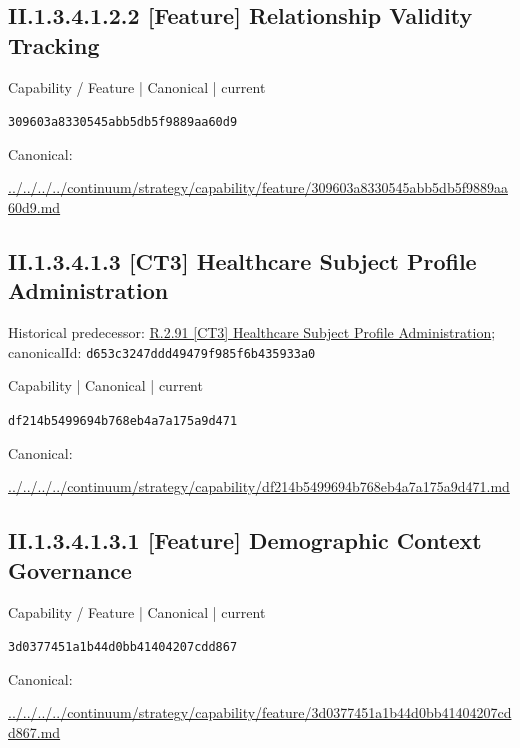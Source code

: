 \documentclass[10pt,a4paper]{article}
\begin{document}
\subsection*{II.1.3.4.1.2.2 [Feature] Relationship Validity Tracking}
\label{element-309603a8330545abb5db5f9889aa60d9}
{\small Capability / Feature | Canonical | current}\par
\texttt{309603a8330545abb5db5f9889aa60d9}\par
Canonical: \par
{\footnotesize\url{../../../../continuum/strategy/capability/feature/309603a8330545abb5db5f9889aa60d9.md}}\par
\subsection*{II.1.3.4.1.3 [CT3] Healthcare Subject Profile Administration}
Historical predecessor: \hyperref[element-d653c3247ddd49479f985f6b435933a0]{R.2.91 [CT3] Healthcare Subject Profile Administration}; canonicalId: \texttt{d653c3247ddd49479f985f6b435933a0}\par
\label{element-df214b5499694b768eb4a7a175a9d471}
{\small Capability | Canonical | current}\par
\texttt{df214b5499694b768eb4a7a175a9d471}\par
Canonical: \par
{\footnotesize\url{../../../../continuum/strategy/capability/df214b5499694b768eb4a7a175a9d471.md}}\par
\subsection*{II.1.3.4.1.3.1 [Feature] Demographic Context Governance}
\label{element-3d0377451a1b44d0bb41404207cdd867}
{\small Capability / Feature | Canonical | current}\par
\texttt{3d0377451a1b44d0bb41404207cdd867}\par
Canonical: \par
{\footnotesize\url{../../../../continuum/strategy/capability/feature/3d0377451a1b44d0bb41404207cdd867.md}}\par
\end{document}
